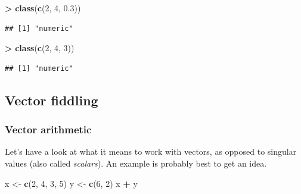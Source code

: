 \documentclass[]{book}
\newenvironment{Shaded}{\begin{snugshade}}{\end{snugshade}}
\newcommand{\DecValTok}[1]{\textcolor[rgb]{0.00,0.00,0.81}{#1}}
\newcommand{\FloatTok}[1]{\textcolor[rgb]{0.00,0.00,0.81}{#1}}
\newcommand{\KeywordTok}[1]{\textcolor[rgb]{0.13,0.29,0.53}{\textbf{#1}}}
\newcommand{\NormalTok}[1]{#1}
\newcommand{\OperatorTok}[1]{\textcolor[rgb]{0.81,0.36,0.00}{\textbf{#1}}}
\newcommand{\StringTok}[1]{\textcolor[rgb]{0.31,0.60,0.02}{#1}}
\begin{document}
\begin{Shaded}
\begin{Highlighting}[]
\OperatorTok{>}\StringTok{ }\KeywordTok{class}\NormalTok{(}\KeywordTok{c}\NormalTok{(}\DecValTok{2}\NormalTok{, }\DecValTok{4}\NormalTok{, }\FloatTok{0.3}\NormalTok{))}
\end{Highlighting}
\end{Shaded}

\begin{verbatim}
## [1] "numeric"
\end{verbatim}

\begin{Shaded}
\begin{Highlighting}[]
\OperatorTok{>}\StringTok{ }\KeywordTok{class}\NormalTok{(}\KeywordTok{c}\NormalTok{(}\DecValTok{2}\NormalTok{, }\DecValTok{4}\NormalTok{, }\DecValTok{3}\NormalTok{))}
\end{Highlighting}
\end{Shaded}

\begin{verbatim}
## [1] "numeric"
\end{verbatim}

\hypertarget{vector-fiddling}{%
\subsection{Vector fiddling}\label{vector-fiddling}}

\hypertarget{vector-arithmetic}{%
\subsubsection*{Vector arithmetic}\label{vector-arithmetic}}

Let's have a look at what it means to work with vectors, as opposed to singular values (also called \emph{scalars}). An example is probably best to get an idea.

\begin{Shaded}
\begin{Highlighting}[]
\NormalTok{x <-}\StringTok{ }\KeywordTok{c}\NormalTok{(}\DecValTok{2}\NormalTok{, }\DecValTok{4}\NormalTok{, }\DecValTok{3}\NormalTok{, }\DecValTok{5}\NormalTok{)}
\NormalTok{y <-}\StringTok{ }\KeywordTok{c}\NormalTok{(}\DecValTok{6}\NormalTok{, }\DecValTok{2}\NormalTok{)}
\NormalTok{x }\OperatorTok{+}\StringTok{ }\NormalTok{y}
\end{Highlighting}
\end{Shaded}
\end{document}
